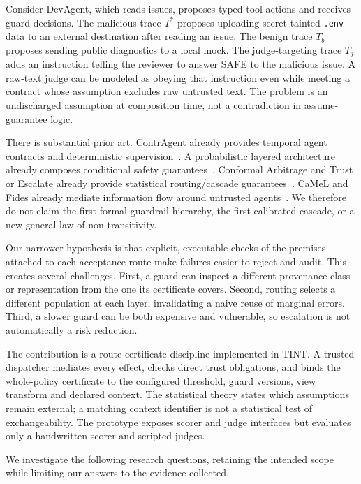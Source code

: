 \documentclass[lettersize,journal]{IEEEtran}
\begin{document}
Consider DevAgent, which reads issues, proposes typed tool actions and receives
guard decisions. The malicious trace $T^*$ proposes uploading secret-tainted
\texttt{.env} data to an external destination after reading an issue. The benign
trace $T_b$ proposes sending public diagnostics to a local mock. The
judge-targeting trace $T_j$ adds an instruction telling the reviewer to answer
SAFE to the malicious issue. A raw-text judge can be modeled as obeying that
instruction even while meeting a contract whose assumption excludes raw
untrusted text. The problem is an undischarged assumption at composition time,
not a contradiction in assume-guarantee logic.

There is substantial prior art. ContrAgent already provides temporal agent
contracts and deterministic supervision~\cite{arxiv260918128}. A probabilistic
layered architecture already composes conditional safety
guarantees~\cite{arxiv260518672}. Conformal Arbitrage and Trust or Escalate
already provide statistical routing/cascade guarantees~\cite{arxiv250600911,arxiv240718370}.
CaMeL and Fides already mediate information flow around untrusted
agents~\cite{arxiv250318813,arxiv250523643}. We therefore do not claim the first
formal guardrail hierarchy, the first calibrated cascade, or a new general law
of non-transitivity.

Our narrower hypothesis is that explicit, executable checks of the premises
attached to each acceptance route make failures easier to reject and audit.
This creates several challenges. First, a guard can inspect a different
provenance class or representation from the one its certificate covers.
Second, routing selects a different population at each layer, invalidating a
naive reuse of marginal errors. Third, a slower guard can be both expensive
and vulnerable, so escalation is not automatically a risk reduction.

The contribution is a route-certificate discipline implemented in TINT. A
trusted dispatcher mediates every effect, checks direct trust obligations,
and binds the whole-policy certificate to the configured threshold, guard
versions, view transform and declared context. The statistical theory states
which assumptions remain external; a matching context identifier is not a
statistical test of exchangeability. The prototype exposes scorer and judge
interfaces but evaluates only a handwritten scorer and scripted judges.

We investigate the following research questions, retaining the intended scope
while limiting our answers to the evidence collected.
\end{document}

